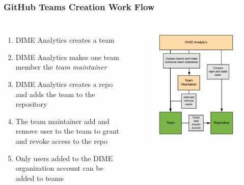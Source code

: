 \documentclass[aspectratio=169]{beamer} %
\begin{document}
\begin{frame}
	\frametitle{GitHub Teams Creation Work Flow}

	\begin{columns}[c]
		
		\begin{enumerate}
			\item DIME Analytics creates a team
			\item DIME Analytics makes one team member the \textit{team maintainer}
			\item DIME Analytics creates a repo and adds the team to the repository
			\item The team maintainer add and remove user to the team to grant and revoke access to the repo
			\item Only users added to the DIME organization account can be added to teams
		\end{enumerate}
		
		\begin{figure}
			\centering
			\includegraphics[width=1\linewidth]{./img/teams-workflow}
		\end{figure}
		
	\end{columns}
\end{frame}
\end{document}
